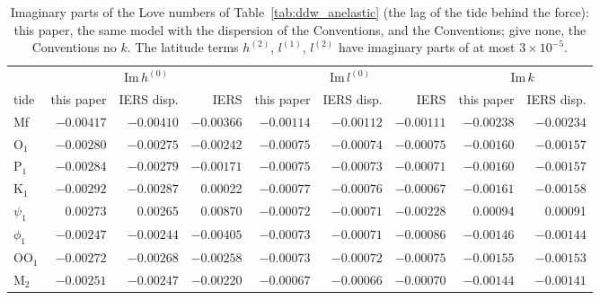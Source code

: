 \begin{table}
\caption{Imaginary parts of the Love numbers of Table~\ref{tab:ddw_anelastic} (the lag of the tide behind the force): this paper, the same model with the dispersion of the Conventions, and the Conventions; \citet{dehant1999} give none, the Conventions no $k$. The latitude terms $h^{(2)}$, $l^{(1)}$, $l^{(2)}$ have imaginary parts of at most $3\times10^{-5}$.}
\label{tab:ddw_anelastic_im}
\small\setlength{\tabcolsep}{3pt}
\begin{tabular*}{\textwidth}{@{\extracolsep{\fill}}lrrrrrrrr@{}}
\toprule
 & \multicolumn{3}{c}{$\mathrm{Im}\,h^{(0)}$} & \multicolumn{3}{c}{$\mathrm{Im}\,l^{(0)}$} & \multicolumn{2}{c}{$\mathrm{Im}\,k$} \\
\cmidrule(lr){2-4}\cmidrule(lr){5-7}\cmidrule(lr){8-9}
tide & this paper & IERS disp. & IERS & this paper & IERS disp. & IERS & this paper & IERS disp. \\
\midrule
Mf & $-0.00417$ & $-0.00410$ & $-0.00366$ & $-0.00114$ & $-0.00112$ & $-0.00111$ & $-0.00238$ & $-0.00234$ \\
O$_1$ & $-0.00280$ & $-0.00275$ & $-0.00242$ & $-0.00075$ & $-0.00074$ & $-0.00075$ & $-0.00160$ & $-0.00157$ \\
P$_1$ & $-0.00284$ & $-0.00279$ & $-0.00171$ & $-0.00075$ & $-0.00073$ & $-0.00071$ & $-0.00160$ & $-0.00157$ \\
K$_1$ & $-0.00292$ & $-0.00287$ & 0.00022 & $-0.00077$ & $-0.00076$ & $-0.00067$ & $-0.00161$ & $-0.00158$ \\
$\psi_1$ & 0.00273 & 0.00265 & 0.00870 & $-0.00072$ & $-0.00071$ & $-0.00228$ & 0.00094 & 0.00091 \\
$\phi_1$ & $-0.00247$ & $-0.00244$ & $-0.00405$ & $-0.00073$ & $-0.00071$ & $-0.00086$ & $-0.00146$ & $-0.00144$ \\
OO$_1$ & $-0.00272$ & $-0.00268$ & $-0.00258$ & $-0.00073$ & $-0.00072$ & $-0.00075$ & $-0.00155$ & $-0.00153$ \\
M$_2$ & $-0.00251$ & $-0.00247$ & $-0.00220$ & $-0.00067$ & $-0.00066$ & $-0.00070$ & $-0.00144$ & $-0.00141$ \\
\bottomrule
\end{tabular*}
\end{table}
